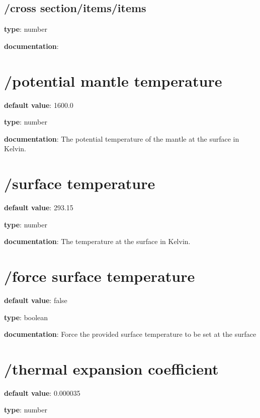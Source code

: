 \begin{itemized}
\begin{itemized}
\subsection{/cross section/items/items} \begin{itemized}
\item {\bf type}: number
\end{itemized}\item {\bf documentation}: 
\end{itemized}\end{itemized}\section{/potential mantle temperature} \begin{itemized}
\item {\bf default value}: 1600.0
\item {\bf type}: number
\item {\bf documentation}: The potential temperature of the mantle at the surface in Kelvin.
\end{itemized}\section{/surface temperature} \begin{itemized}
\item {\bf default value}: 293.15
\item {\bf type}: number
\item {\bf documentation}: The temperature at the surface in Kelvin.
\end{itemized}\section{/force surface temperature} \begin{itemized}
\item {\bf default value}: false
\item {\bf type}: boolean
\item {\bf documentation}: Force the provided surface temperature to be set at the surface
\end{itemized}\section{/thermal expansion coefficient} \begin{itemized}
\item {\bf default value}: 0.000035
\item {\bf type}: number

\end{itemized}
